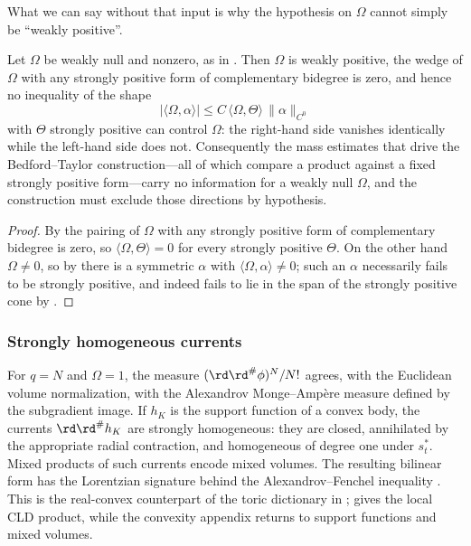 What we can say without that input is why the hypothesis on $\Omega$ cannot
simply be ``weakly positive''.

\begin{proposition}
\label{prop:ch14-why-strong}
Let $\Omega$ be weakly null and nonzero, as in .
Then $\Omega$ is weakly positive, the wedge of $\Omega$ with any strongly
positive form of complementary bidegree is zero, and hence no
inequality of the shape
\[
 \bigl|\langle\Omega,\alpha\rangle\bigr|
 \le C\,\langle\Omega,\Theta\rangle\,\|\alpha\|_{C^0}
\]
with $\Theta$ strongly positive can control $\Omega$: the right-hand side
vanishes identically while the left-hand side does not.  Consequently the
mass estimates that drive the Bedford--Taylor construction---all of which
compare a product against a fixed strongly positive form---carry no
information for a weakly null $\Omega$, and the construction must exclude
those directions by hypothesis.
\end{proposition}

\begin{proof}
By  the pairing of $\Omega$ with any strongly
positive form of complementary bidegree is zero, so
$\langle\Omega,\Theta\rangle=0$ for every strongly positive $\Theta$.  On the
other hand $\Omega\ne0$, so by  there is a
symmetric $\alpha$ with $\langle\Omega,\alpha\rangle\ne0$; such an $\alpha$
necessarily fails to be strongly positive, and indeed fails to lie in the
span of the strongly positive cone by .
\end{proof}

\subsubsection{Strongly homogeneous currents}

For $q=N$ and $\Omega=1$, the measure
$(\rd\rd^\#\phi)^N/N!$ agrees, with the Euclidean volume normalization, with the
Alexandrov Monge--Amp\`ere measure defined by the subgradient image.  If
$h_K$ is the support function of a convex body, the currents $\rd\rd^\#h_K$ are
strongly homogeneous: they are closed, annihilated by the appropriate radial contraction, and
homogeneous of degree one under $s_t^*$.  Mixed products
of such currents encode mixed volumes.  The resulting bilinear form has the
Lorentzian signature behind the Alexandrov--Fenchel inequality
\cite[\S\S5--6 and 10]{Ber26Convex}.  This is the real-convex counterpart of
the toric dictionary in ; 
gives the local CLD product, while the convexity appendix returns to support
functions and mixed volumes.


